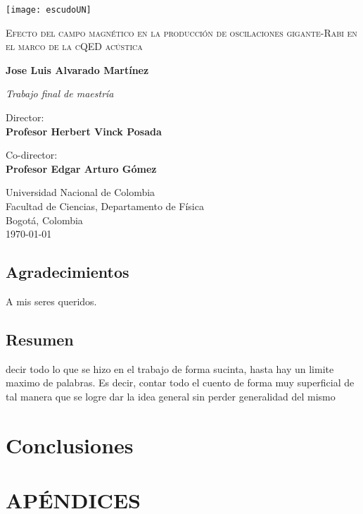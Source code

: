 \documentclass[12pt,a4paper,oneside,parskip=half]{scrbook}
\begin{document}
\frontmatter
%
\begin{titlepage}
\centering
\texttt{[image: escudoUN]}\par
\vspace{1cm}
{\scshape \Huge Efecto del campo magnético en la producción de oscilaciones gigante-Rabi en el marco de la cQED acústica \par}
\vfill
{\Large \textbf{Jose Luis Alvarado Martínez} \par}
\vfill
{\large \textit{Trabajo final de maestr\'ia} \par}
\vfill
{\large Director:\\ \textbf{Profesor Herbert Vinck Posada} \par}
\vfill
{\large Co-director:\\ \textbf{Profesor Edgar Arturo Gómez} \par}
\vfill
{\large Universidad Nacional de Colombia\\
	Facultad de Ciencias, Departamento de F\'isica\\
	Bogot\'a, Colombia\\
	\today \par}
\end{titlepage}
%
\section*{Agradecimientos}
A mis seres queridos.
%
\newpage
%
\section*{Resumen}
decir todo lo que se hizo en el trabajo de forma sucinta, hasta hay un limite maximo de palabras. Es decir, contar todo el cuento de forma muy superficial de tal manera que se logre dar la idea general sin perder generalidad del mismo
%
\tableofcontents
\listoffigures
%
\mainmatter
%









\chapter*{Conclusiones}

%
\appendix
\chapter*{\textsc{AP\'ENDICES}}

\backmatter
%
\printbibliography[heading=subbibliography]
%
\end{document}

